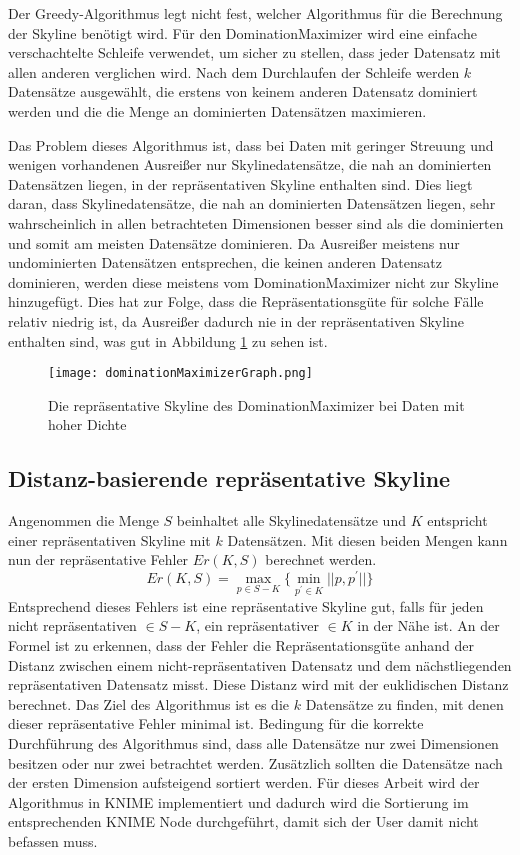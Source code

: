 Der Greedy-Algorithmus legt nicht fest, welcher Algorithmus für die Berechnung der Skyline benötigt wird. Für den DominationMaximizer wird eine einfache verschachtelte Schleife verwendet, um sicher zu stellen, dass jeder Datensatz mit allen anderen verglichen wird. 
Nach dem Durchlaufen der Schleife werden $k$ Datensätze ausgewählt, die erstens von keinem anderen Datensatz dominiert werden und die die Menge an dominierten Datensätzen maximieren.

Das Problem dieses Algorithmus ist, dass bei Daten mit geringer Streuung und wenigen vorhandenen Ausreißer nur Skylinedatensätze, die nah an dominierten Datensätzen liegen, in der repräsentativen Skyline enthalten sind. Dies liegt daran, dass Skylinedatensätze, die nah an dominierten Datensätzen liegen, sehr wahrscheinlich in allen betrachteten Dimensionen besser sind als die dominierten und somit am meisten Datensätze dominieren.  Da Ausreißer meistens nur undominierten Datensätzen entsprechen, die keinen anderen Datensatz dominieren, werden diese meistens vom DominationMaximizer nicht zur Skyline hinzugefügt. Dies hat zur Folge, dass die Repräsentationsgüte für solche Fälle relativ niedrig ist, da Ausreißer dadurch nie in der repräsentativen Skyline enthalten sind, was gut in Abbildung \ref{img:dominationMaximizerGraph} zu sehen ist.
 
\begin{figure}[H]
	\centering
	\texttt{[image: dominationMaximizerGraph.png]}
	\caption{Die repräsentative Skyline des DominationMaximizer bei Daten mit hoher Dichte}
	\label{img:dominationMaximizerGraph}
\end{figure}
\subsection{Distanz-basierende repräsentative Skyline}
\label{ch:Analyse:sec:repSkyAlgos:subsec:disBasedRepSky}
Angenommen die Menge $S$ beinhaltet alle Skylinedatensätze und $K$ entspricht einer repräsentativen Skyline mit $k$ Datensätzen. Mit diesen beiden Mengen kann nun der repräsentative Fehler $Er(K,S)$ berechnet werden. 
$$Er(K,S)=\max\limits_{p\in{S-K}}\{\min\limits_{p^{'} \in{K}}||p,p^{'}||\}$$
Entsprechend dieses Fehlers ist eine repräsentative Skyline gut, falls für jeden nicht repräsentativen $\in{S-K}$, ein repräsentativer $\in{K}$ in der Nähe ist. An der Formel ist zu erkennen, dass der Fehler die Repräsentationsgüte anhand der Distanz zwischen einem nicht-repräsentativen Datensatz und dem nächstliegenden repräsentativen Datensatz misst. Diese Distanz wird mit der euklidischen Distanz berechnet.
Das Ziel des Algorithmus ist es die $k$ Datensätze zu finden, mit denen dieser repräsentative Fehler minimal ist. Bedingung für die korrekte Durchführung des Algorithmus sind, dass alle Datensätze nur zwei Dimensionen besitzen oder nur zwei betrachtet werden. Zusätzlich sollten die Datensätze nach der ersten Dimension aufsteigend sortiert werden. Für dieses Arbeit wird der Algorithmus in KNIME implementiert und dadurch wird die Sortierung im entsprechenden KNIME Node durchgeführt, damit sich der User damit nicht befassen muss. 

